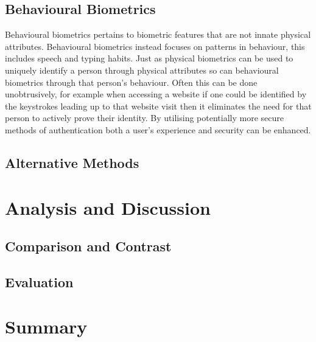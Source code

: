 \documentclass[12pt]{article}
\begin{document}
	\subsection{Behavioural Biometrics}
	\label{subsect_behavioral_biometrics}
	Behavioural biometrics pertains to biometric features that are not innate physical attributes. Behavioural biometrics instead focuses on patterns in behaviour, this includes speech and typing habits. Just as physical biometrics can be used to uniquely identify a person through physical attributes so can behavioural biometrics through that person's behaviour. Often this can be done unobtrusively, for example when accessing a website if one could be identified by the keystrokes leading up to that website visit then it eliminates the need for that person to actively prove their identity. By utilising potentially more secure methods of authentication both a user's experience and security can be enhanced.
	\subsection{Alternative Methods}
	
	
	\section{Analysis and Discussion}
	\label{sect_analysis}
	
	\subsection{Comparison and Contrast}
	
	
	\subsection{Evaluation}
	
	\section{Summary}
	
	
	 
	
\end{document}
